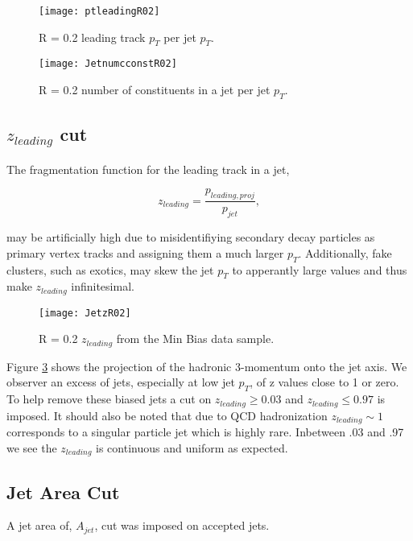 \begin{figure}[h]
\texttt{[image: ptleadingR02]}
\centering
\caption{R = 0.2 leading track $p_{T}$ per jet $p_{T}$.}
\label{fig:JetPt}
\end{figure}

\begin{figure}[h]
\texttt{[image: JetnumcconstR02]}
\centering
\caption{R = 0.2 number of constituents in a jet per jet $p_{T}$.}
\label{fig:JetConst}
\end{figure}



\noindent
\subsection{$z_{leading}$ cut}

The fragmentation function for the leading track in a jet,

\begin{equation}
z_{leading} = \frac{ p_{leading, proj} }{ p_{jet} },
\label{eq:zleading}
\end{equation}

\noindent
may be artificially high due to misidentifiying secondary decay particles as primary vertex tracks and assigning them a much larger $p_{T}$.  Additionally, fake clusters, such as exotics, may skew the jet $p_{T}$ to apperantly large values and thus make $z_{leading}$ infinitesimal.  

\begin{figure}[h]
\texttt{[image: JetzR02]}
\centering
\caption{R = 0.2 $z_{leading}$ from the Min Bias data sample.}
\label{fig:Jetz}
\end{figure}

\noindent
Figure \ref{fig:Jetz} shows the projection of the hadronic 3-momentum onto the jet axis.  We observer an excess of jets, especially at low jet $p_{T}$, of z values close to 1 or zero.  To help remove these biased jets a cut on $ z_{leading} \geq 0.03$ and $z_{leading} \leq 0.97$ is imposed.  It should also be noted that due to QCD hadronization $z_{leading} \sim 1$ corresponds to a singular particle jet which is highly rare.  Inbetween .03 and .97 we see the $z_{leading}$ is continuous and uniform as expected.  

\subsection{Jet Area Cut}

A jet area of, $A_{jet}$, cut was imposed on accepted jets.

